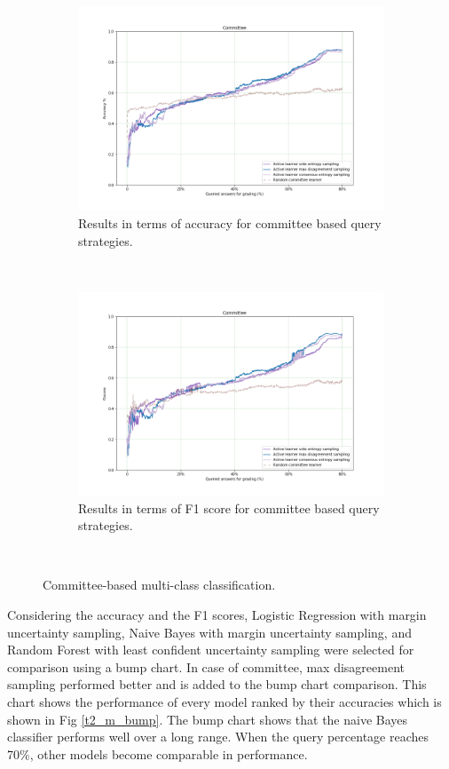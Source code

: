  
 \begin{figure}[!htb]
 	\begin{subfigure}[b]{0.5\textwidth}
 		\includegraphics[width=\textwidth]{images/task2_accuracy_com}
 		\caption{Results in terms of accuracy for committee based query strategies.}
 		\label{t2_m_com}
 	\end{subfigure}
 	~
 	\begin{subfigure}[b]{0.5\textwidth}
 		\includegraphics[width=\textwidth]{images/task2_f1score_com}
 		\caption{Results in terms of F1 score for committee based query strategies.}
 		\label{t2_m_com_f1}
 	\end{subfigure}
 	~
 	\caption{Committee-based multi-class classification.}
 \end{figure}
 
  Considering the accuracy and the F1 scores, Logistic Regression with margin uncertainty sampling, Naive Bayes with margin uncertainty sampling, and Random Forest with least confident uncertainty sampling were selected for comparison using a bump chart. In case of committee, max disagreement sampling performed better and is added to the bump chart comparison. This chart shows the performance of every model ranked by their accuracies which is shown in Fig \ref{t2_m_bump}. The bump chart shows that the naive Bayes classifier performs well over a long range. When the query percentage reaches 70\%, other models become comparable in performance.
 
